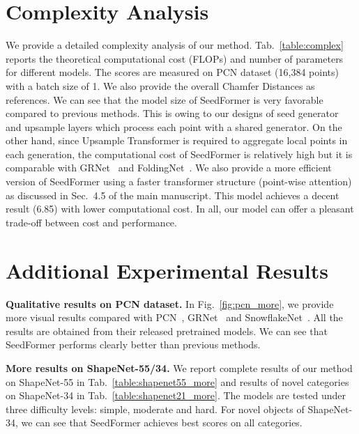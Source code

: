 \section{Complexity Analysis}
\label{sec:supp:complex}
We provide a detailed complexity analysis of our method. Tab.~\ref{table:complex} reports the theoretical computational cost (FLOPs) and number of parameters for different models. The scores are measured on PCN dataset (16,384 points) with a batch size of 1. We also provide the overall Chamfer Distances as references. We can see that the model size of SeedFormer is very favorable compared to previous methods. This is owing to our designs of seed generator and upsample layers which process each point with a shared generator. 
On the other hand, since Upsample Transformer is required to aggregate local points in each generation, the computational cost of SeedFormer is relatively high but it is comparable with GRNet~\cite{xie2020grnet} and FoldingNet~\cite{yang2018foldingnet}. We also provide a more efficient version of SeedFormer using a faster transformer structure (point-wise attention) as discussed in Sec.~4.5 of the main manuscript. This model achieves a decent result (6.85) with lower computational cost. In all, our model can offer a pleasant trade-off between cost and performance.




\section{Additional Experimental Results}
\label{sec:supp:experiment}
\textbf{Qualitative results on PCN dataset.} In Fig.~\ref{fig:pcn_more}, we provide more visual results compared with PCN~\cite{yuan2018pcn}, GRNet~\cite{xie2020grnet} and SnowflakeNet~\cite{xiang2021snowflakenet}. All the results are obtained from their released pretrained models. We can see that SeedFormer performs clearly better than previous methods.

\vspace{5pt}
\noindent\textbf{More results on ShapeNet-55/34.} We report complete results of our method on ShapeNet-55 in Tab.~\ref{table:shapenet55_more} and results of novel categories on ShapeNet-34 in Tab.~\ref{table:shapenet21_more}. The models are tested under three difficulty levels: simple, moderate and hard. For novel objects of ShapeNet-34, we can see that SeedFormer achieves best scores on all categories.


